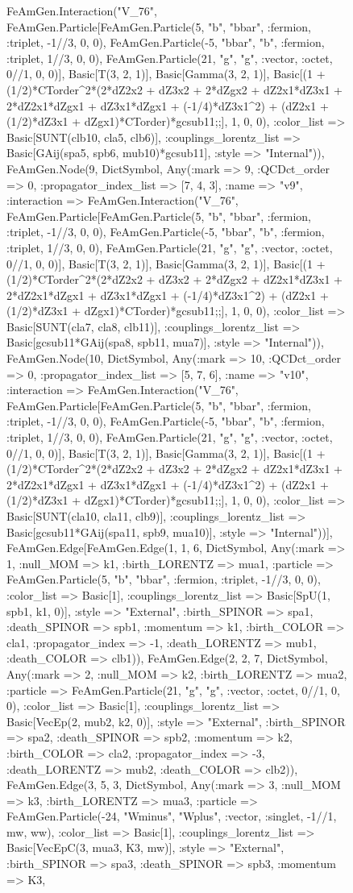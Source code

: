 \documentclass{revtex4}
\begin{document}
\begin{figure}[!htb]
\begin{center}
{FeAmGen.Interaction("V_76", FeAmGen.Particle[FeAmGen.Particle(5, "b", "bbar", :fermion, :triplet, -1//3, 0, 0), FeAmGen.Particle(-5, "bbar", "b", :fermion, :triplet, 1//3, 0, 0), FeAmGen.Particle(21, "g", "g", :vector, :octet, 0//1, 0, 0)], Basic[T(3, 2, 1)], Basic[Gamma(3, 2, 1)], Basic[(1 + (1/2)*CTorder^2*(2*dZ2x2 + dZ3x2 + 2*dZgx2 + dZ2x1*dZ3x1 + 2*dZ2x1*dZgx1 + dZ3x1*dZgx1 + (-1/4)*dZ3x1^2) + (dZ2x1 + (1/2)*dZ3x1 + dZgx1)*CTorder)*gcsub11;;], 1, 0, 0), :color_list => Basic[SUNT(clb10, cla5, clb6)], :couplings_lorentz_list => Basic[GAij(spa5, spb6, mub10)*gcsub11], :style => "Internal")), FeAmGen.Node(9, Dict{Symbol, Any}(:mark => 9, :QCDct_order => 0, :propagator_index_list => [7, 4, 3], :name => "v9", :interaction => FeAmGen.Interaction("V_76", FeAmGen.Particle[FeAmGen.Particle(5, "b", "bbar", :fermion, :triplet, -1//3, 0, 0), FeAmGen.Particle(-5, "bbar", "b", :fermion, :triplet, 1//3, 0, 0), FeAmGen.Particle(21, "g", "g", :vector, :octet, 0//1, 0, 0)], Basic[T(3, 2, 1)], Basic[Gamma(3, 2, 1)], Basic[(1 + (1/2)*CTorder^2*(2*dZ2x2 + dZ3x2 + 2*dZgx2 + dZ2x1*dZ3x1 + 2*dZ2x1*dZgx1 + dZ3x1*dZgx1 + (-1/4)*dZ3x1^2) + (dZ2x1 + (1/2)*dZ3x1 + dZgx1)*CTorder)*gcsub11;;], 1, 0, 0), :color_list => Basic[SUNT(cla7, cla8, clb11)], :couplings_lorentz_list => Basic[gcsub11*GAij(spa8, spb11, mua7)], :style => "Internal")), FeAmGen.Node(10, Dict{Symbol, Any}(:mark => 10, :QCDct_order => 0, :propagator_index_list => [5, 7, 6], :name => "v10", :interaction => FeAmGen.Interaction("V_76", FeAmGen.Particle[FeAmGen.Particle(5, "b", "bbar", :fermion, :triplet, -1//3, 0, 0), FeAmGen.Particle(-5, "bbar", "b", :fermion, :triplet, 1//3, 0, 0), FeAmGen.Particle(21, "g", "g", :vector, :octet, 0//1, 0, 0)], Basic[T(3, 2, 1)], Basic[Gamma(3, 2, 1)], Basic[(1 + (1/2)*CTorder^2*(2*dZ2x2 + dZ3x2 + 2*dZgx2 + dZ2x1*dZ3x1 + 2*dZ2x1*dZgx1 + dZ3x1*dZgx1 + (-1/4)*dZ3x1^2) + (dZ2x1 + (1/2)*dZ3x1 + dZgx1)*CTorder)*gcsub11;;], 1, 0, 0), :color_list => Basic[SUNT(cla10, cla11, clb9)], :couplings_lorentz_list => Basic[gcsub11*GAij(spa11, spb9, mua10)], :style => "Internal"))], FeAmGen.Edge[FeAmGen.Edge(1, 1, 6, Dict{Symbol, Any}(:mark => 1, :null_MOM => k1, :birth_LORENTZ => mua1, :particle => FeAmGen.Particle(5, "b", "bbar", :fermion, :triplet, -1//3, 0, 0), :color_list => Basic[1], :couplings_lorentz_list => Basic[SpU(1, spb1, k1, 0)], :style => "External", :birth_SPINOR => spa1, :death_SPINOR => spb1, :momentum => k1, :birth_COLOR => cla1, :propagator_index => -1, :death_LORENTZ => mub1, :death_COLOR => clb1)), FeAmGen.Edge(2, 2, 7, Dict{Symbol, Any}(:mark => 2, :null_MOM => k2, :birth_LORENTZ => mua2, :particle => FeAmGen.Particle(21, "g", "g", :vector, :octet, 0//1, 0, 0), :color_list => Basic[1], :couplings_lorentz_list => Basic[VecEp(2, mub2, k2, 0)], :style => "External", :birth_SPINOR => spa2, :death_SPINOR => spb2, :momentum => k2, :birth_COLOR => cla2, :propagator_index => -3, :death_LORENTZ => mub2, :death_COLOR => clb2)), FeAmGen.Edge(3, 5, 3, Dict{Symbol, Any}(:mark => 3, :null_MOM => k3, :birth_LORENTZ => mua3, :particle => FeAmGen.Particle(-24, "Wminus", "Wplus", :vector, :singlet, -1//1, mw, ww), :color_list => Basic[1], :couplings_lorentz_list => Basic[VecEpC(3, mua3, K3, mw)], :style => "External", :birth_SPINOR => spa3, :death_SPINOR => spb3, :momentum => K3, }
\end{center}
\end{figure}
\end{document}
